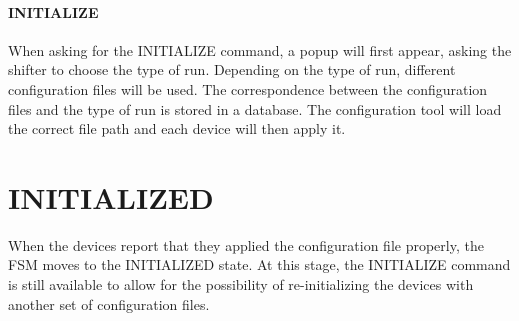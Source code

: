 \documentclass[a4paper]{article}
\begin{document}
\paragraph{INITIALIZE} When asking for the INITIALIZE command, a popup will first appear, asking the shifter to choose the type of run. Depending on the type of run, different configuration files will be used. The correspondence between the configuration files and the type of run is stored in a database. The configuration tool will load the correct file path and each device will then apply it.

\section{INITIALIZED}
When the devices report that they applied the configuration file properly, the FSM moves to the INITIALIZED state. At this stage, the INITIALIZE command is still available to allow for the possibility of re-initializing the devices with another set of configuration files.
\end{document}
